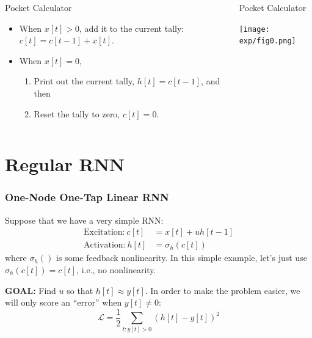 \documentclass{beamer}
\begin{document}
\begin{frame}  
  \begin{columns}
    \column{2in}
    \begin{block}{Pocket Calculator}
      \begin{itemize}
      \item When $x[t]>0$, add it to the current tally: $c[t]=c[t-1]+x[t]$.
      \item When $x[t]=0$,
        \begin{enumerate}
        \item Print out the current tally, $h[t]=c[t-1]$, and then
        \item Reset the tally to zero, $c[t]=0$.
        \end{enumerate}
      \end{itemize}
    \end{block}
    \column{2.25in}
    \begin{block}{Pocket Calculator}
      \centerline{\texttt{[image: exp/fig0.png]}}
    \end{block}
    \end{columns}
\end{frame}
  
\section[RNN]{Regular RNN}
\setcounter{subsection}{1}

\begin{frame}
  \frametitle{One-Node One-Tap Linear RNN}
  Suppose that we have a very simple RNN:
  \begin{align*}
    \mbox{Excitation:}~c[t] &= x[t]+uh[t-1]\\
    \mbox{Activation:}~h[t] &= \sigma_h\left(c[t]\right)
  \end{align*}
  where $\sigma_h()$ is some feedback nonlinearity.  In this simple
  example, let's just use $\sigma_h(c[t])=c[t]$, i.e., no
  nonlinearity. 

  {\bf GOAL:} Find $u$ so that $h[t]\approx
  y[t]$.  In order to make the problem easier, we will only score an
  ``error'' when $y[t]\ne 0$:
  \[
  {\mathcal L} = \frac{1}{2}\sum_{t:y[t]>0} \left(h[t]-y[t]\right)^2
  \]
\end{frame}
\end{document}
